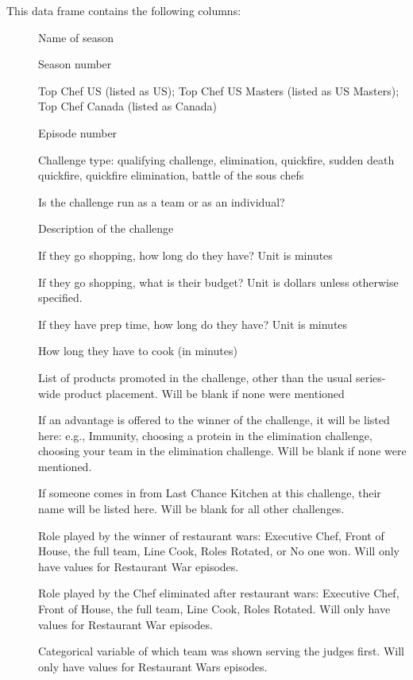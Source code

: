 \documentclass[a4paper]{book}
\begin{document}
\begin{Format}
This data frame contains the following columns:
\begin{description}

\item[] Name of season
\item[] Season number
\item[] Top Chef US (listed as US); Top Chef US Masters
(listed as US Masters); Top Chef Canada (listed as Canada)
\item[] Episode number
\item[] Challenge type: qualifying challenge,
elimination, quickfire, sudden death quickfire, quickfire
elimination, battle of the sous chefs
\item[] Is the challenge run as a team or as an
individual?
\item[] Description of the challenge
\item[] If they go shopping, how long do they have?
Unit is minutes
\item[] If they go shopping, what is their budget?
Unit is dollars unless otherwise specified.
\item[] If they have prep time, how long do they have?
Unit is minutes
\item[] How long they have to cook (in minutes)
\item[] List of products promoted in the
challenge, other than the usual series-wide product placement.
Will be blank if none were mentioned
\item[] If an advantage is offered to the winner of the
challenge, it will be listed here: e.g., Immunity, choosing
a protein in the elimination challenge, choosing your team in
the elimination challenge. Will be blank if none were mentioned.
\item[] If someone comes in from
Last Chance Kitchen at this challenge, their name will be listed here.
Will be blank for all other challenges.
\item[] Role played by the winner of
restaurant wars: Executive Chef, Front of House, the full team,
Line Cook, Roles Rotated, or No one won. Will only have values
for Restaurant War episodes.
\item[] Role played by the Chef eliminated
after restaurant wars: Executive Chef, Front of House, the full
team, Line Cook, Roles Rotated. Will only have values for
Restaurant War episodes.
\item[] Categorical variable of
which team was shown serving the judges first. Will only have values for
Restaurant Wars episodes.

\end{description}

\end{Format}
\end{document}
